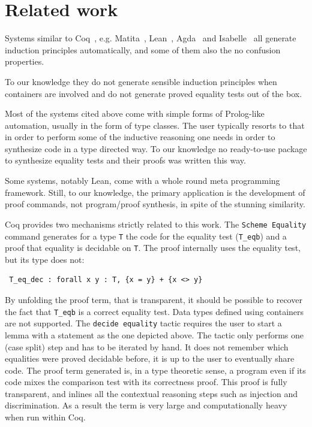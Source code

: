 \documentclass[a4paper,UKenglish,cleveref, autoref]{lipics-v2019}
\begin{document}
\section{Related work} %
\label{sec:related}

Systems similar to Coq~\cite{the_coq_development_team_2018_1219885},
e.g. Matita~\cite{10.1007/978-3-642-22438-6_7},
Lean~\cite{10.1007/978-3-319-21401-6_26}, Agda~\cite{norell:thesis} and
Isabelle~\cite{Nipkow:2002:IPA:1791547} all generate
induction principles automatically, and some of them also the
no confusion properties. 

To our knowledge they do not generate sensible induction principles
when containers are involved and do not generate proved equality tests
out of the box.



Most of the systems cited above come with simple forms of Prolog-like
automation, usually in the form of type classes. The user typically
resorts to that in order to perform some of the inductive reasoning
one needs in order to synthesize code in a type directed way.
To our knowledge no ready-to-use package to synthesize equality tests
and their proofs was written this way.

Some systems, notably Lean, come with a whole round meta programming 
framework. Still, to our knowledge, the primary application is the
development of proof commands, not program/proof synthesis, in spite
of the stunning similarity.

Coq provides two mechanisms strictly related to this work.
The \lstinline+Scheme Equality+ command generates for a type
\lstinline+T+ the code for the equality test (\lstinline+T_eqb+) 
and a proof that equality is decidable on \lstinline+T+. The proof
internally uses the equality test, but its type does not:

\begin{lstlisting}
 T_eq_dec : forall x y : T, {x = y} + {x <> y}
\end{lstlisting}

\noindent
By unfolding the proof term, that is transparent, it should be
possible to recover the fact that \lstinline+T_eqb+ is a correct
equality test. Data types defined using containers are not supported.
The \lstinline+decide equality+ tactic requires the user to start
a lemma with a statement as the one depicted above.
The tactic only performs one (case split) step and has to
be iterated by hand. It does not remember which equalities were
proved decidable before, it is up to the user to eventually share code.
The proof term generated is, in a type theoretic sense, a program
even if its code mixes the comparison test with its correctness proof.
This proof is fully transparent, and inlines all the contextual
reasoning steps such as injection and discrimination. As a result the
term is very large and computationally heavy when run within Coq.
\end{document}
